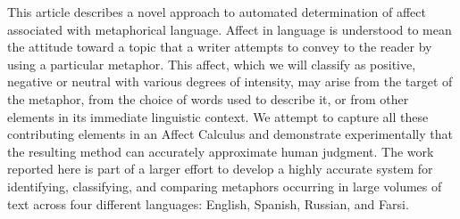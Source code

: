 This article describes a novel approach to automated determination of affect associated with metaphorical language. Affect in language is understood to mean the attitude toward a topic that a writer attempts to convey to the reader by using a particular metaphor. This affect, which we will classify as positive, negative or neutral with various degrees of intensity, may arise from the target of the metaphor, from the choice of words used to describe it, or from other elements in its immediate linguistic context. We attempt to capture all these contributing elements in an Affect Calculus and demonstrate experimentally that the resulting method can accurately approximate human judgment. The work reported here is part of a larger effort to develop a highly accurate system for identifying, classifying, and comparing metaphors occurring in large volumes of text across four different languages: English, Spanish, Russian, and Farsi.
